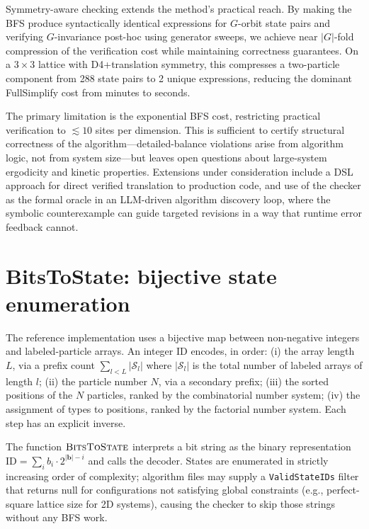 \documentclass[twocolumn,10pt]{article}
\begin{document}
Symmetry-aware checking extends the method's practical reach.  By making the
BFS produce syntactically identical expressions for $G$-orbit state pairs and
verifying $G$-invariance post-hoc using generator sweeps, we achieve near
$|G|$-fold compression of the verification cost while maintaining correctness
guarantees.  On a $3\times3$ lattice with D4+translation symmetry, this
compresses a two-particle component from 288 state pairs to 2 unique
expressions, reducing the dominant FullSimplify cost from minutes to seconds.

The primary limitation is the exponential BFS cost, restricting practical
verification to $\lesssim\!10$ sites per dimension.  This is sufficient to
certify structural correctness of the algorithm---detailed-balance violations
arise from algorithm logic, not from system size---but leaves open questions
about large-system ergodicity and kinetic properties.  Extensions under
consideration include a DSL approach for direct verified translation to
production code, and use of the checker as the formal oracle in an LLM-driven
algorithm discovery loop, where the symbolic counterexample can guide targeted
revisions in a way that runtime error feedback cannot.

\appendix

\section{BitsToState: bijective state enumeration}
\label{app:bitstostate}

The reference implementation uses a bijective map between non-negative
integers and labeled-particle arrays.  An integer $\mathrm{ID}$ encodes, in
order: (i) the array length $L$, via a prefix count
$\sum_{l<L}|\mathcal{S}_l|$ where $|\mathcal{S}_l|$ is the total number of
labeled arrays of length $l$; (ii) the particle number $N$, via a secondary
prefix; (iii) the sorted positions of the $N$ particles, ranked by the
combinatorial number system; (iv) the assignment of types to positions,
ranked by the factorial number system.  Each step has an explicit inverse.

The function $\textsc{BitsToState}$ interprets a bit string as the binary
representation $\mathrm{ID}=\sum_i b_i\cdot 2^{|\mathbf{b}|-i}$ and calls
the decoder.  States are enumerated in strictly increasing order of
complexity; algorithm files may supply a \texttt{ValidStateIDs} filter that
returns null for configurations not satisfying global constraints (e.g.,
perfect-square lattice size for 2D systems), causing the checker to skip
those strings without any BFS work.
\end{document}

